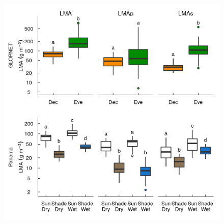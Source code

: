 \documentclass[
  12pt,
  a4paper,
,tablecaptionabove
]{scrartcl}
\providecommand{\DIFaddbeginFL}{} %
\providecommand{\DIFdelbeginFL}{} %
\providecommand{\DIFdelendFL}{} %
\newcommand{\DIFscaledelfig}{0.5}
\newlength{\DIFdelgraphicswidth} %
\newlength{\DIFdelgraphicsheight} %
\newcommand{\DIFaddincludegraphics}[2][]{{\color{blue}\fbox{\DIFOincludegraphics[#1]{#2}}}} %
\newcommand{\DIFdelincludegraphics}[2][]{%
\sbox{\DIFdelgraphicsbox}{\DIFOincludegraphics[#1]{#2}}%
\settoboxwidth{\DIFdelgraphicswidth}{\DIFdelgraphicsbox} %
\settoboxtotalheight{\DIFdelgraphicsheight}{\DIFdelgraphicsbox} %
\scalebox{\DIFscaledelfig}{%
\parbox[b]{\DIFdelgraphicswidth}{\usebox{\DIFdelgraphicsbox}\\[-\baselineskip] \rule{\DIFdelgraphicswidth}{0em}}\llap{\resizebox{\DIFdelgraphicswidth}{\DIFdelgraphicsheight}{%
\setlength{\unitlength}{\DIFdelgraphicswidth}%
\begin{picture}(1,1)%
\thicklines\linethickness{2pt} %
{\color[rgb]{1,0,0}\put(0,0){\framebox(1,1){}}}%
{\color[rgb]{1,0,0}\put(0,0){\line( 1,1){1}}}%
{\color[rgb]{1,0,0}\put(0,1){\line(1,-1){1}}}%
\end{picture}%
}\hspace*{3pt}}} %
} %
\DeclareRobustCommand{\DIFaddbeginFL}{\DIFOaddbeginFL \let\includegraphics\DIFaddincludegraphics} %
\DeclareRobustCommand{\DIFdelbeginFL}{\DIFOdelbeginFL \let\includegraphics\DIFdelincludegraphics} %
\DeclareRobustCommand{\DIFdelendFL}{\DIFOaddendFL \let\includegraphics\DIFOincludegraphics} %
\begin{document}
\begin{figure}
\DIFdelbeginFL %
\DIFdelendFL \DIFaddbeginFL 

{\centering \includegraphics{../figs/box_main.png}

}
\end{figure}
\end{document}
